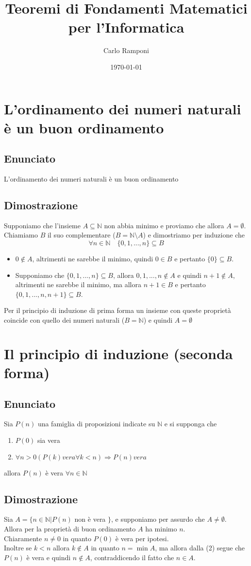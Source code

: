 \documentclass[a4paper,12pt]{article}
\begin{document}
\title{Teoremi di Fondamenti Matematici per l'Informatica}
\author{Carlo Ramponi}
\date{\today}
\maketitle

\newpage

\newcommand{\N}{\mathbb{N}}
\newcommand{\Z}{\mathbb{Z}}

\newcommand{\teorema}[3]{
	\section{#1}
	\subsection*{Enunciato}
	#2
	\subsection*{Dimostrazione}
	#3
	\clearpage
}

\tableofcontents

\clearpage

\teorema{L'ordinamento dei numeri naturali è un buon ordinamento} 
{
	L'ordinamento dei numeri naturali è un buon ordinamento
}
{
Supponiamo che l'insieme $ A \subseteq \N $ non abbia minimo e proviamo che allora $ A = \emptyset $. Chiamiamo $ B $ il suo complementare ($ B = \N \setminus A $) e dimostriamo per induzione che \[ \forall n \in \N \quad \{0, 1, ..., n\} \subseteq B \]
\begin{itemize}
	\item $ 0 \notin A  $, altrimenti ne sarebbe il minimo, quindi $ 0 \in B $ e pertanto $ \{0\} \subseteq B $.
	\item Supponiamo che $\{0, 1, ..., n\} \subseteq B$, allora $0, 1, ..., n \notin A$ e quindi $n+1 \notin A$, altrimenti ne sarebbe il minimo, ma allora $n+1 \in B$ e pertanto $\{0, 1, ..., n, n+1\} \subseteq B$.\\
\end{itemize}
Per il principio di induzione di prima forma un insieme con queste proprietà coincide con quello dei numeri naturali ($B = \N$) e quindi $A = \emptyset$
}

\teorema{Il principio di induzione (seconda forma)}
{
	Sia $P(n)$ una famiglia di proposizioni indicate su $\N$ e si supponga che
	\begin{enumerate}
		\item $P(0)$ sia vera
		\item $\forall n > 0 (P(k) vera \forall k < n) \Rightarrow P(n) vera$
	\end{enumerate}
	allora $P(n)$ è vera $\forall n \in \N$
}
{
	Sia $A = \{n \in \N | P(n)$ non è vera $\}$, e supponiamo per assurdo che $A \neq \emptyset$.\\
	Allora per la proprietà di buon ordinamento $A$ ha minimo $n$.\\
	Chiaramente $n \neq 0$ in quanto $P(0)$ è vera per ipotesi.\\
	Inoltre se $k < n$ allora $k \notin A$ in quanto $n = \min A$, ma allora dalla (2) segue che $P(n)$ è vera e quindi $n \notin A$, contraddicendo il fatto che $n \in A$.
}
\end{document}

